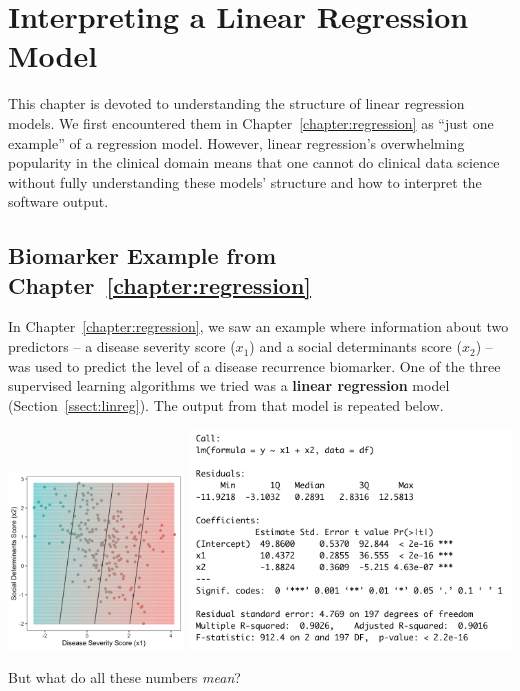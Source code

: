 \chapter{Interpreting a Linear Regression Model \label{chapter:linreg}}

This chapter is devoted to understanding the structure of linear regression models. We first encountered them in Chapter~\ref{chapter:regression} as ``just one example'' of a regression model. However, linear regression's overwhelming popularity in the clinical domain means that one cannot do clinical data science without fully understanding these models' structure and how to interpret the software output. 


\section{Biomarker Example from Chapter~\ref{chapter:regression}}

In Chapter~\ref{chapter:regression}, we saw an example where information about two predictors -- a disease severity score ($x_1$) and a social determinants score ($x_2$) -- was used to predict the level of a disease recurrence biomarker. One of the three supervised learning algorithms we tried was a \textbf{linear regression} model (Section~\ref{ssect:linreg}). The output from that model is repeated below.
\begin{center}
\includegraphics[width=0.35\textwidth]{img/esl-reg-linear.png}
\includegraphics[width=0.64\textwidth]{img/linear-regression-model-output.png}
\end{center}
But what do all these numbers \emph{mean}?
\vspace{5mm}

